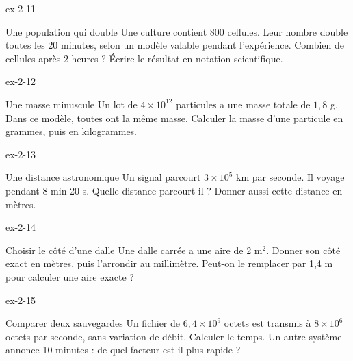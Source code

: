 \clearpage{}
\begin{blocLivre}{ex-2-11}\begin{exercice}[3]{Une population qui double}
Une culture contient 800 cellules. Leur nombre double toutes les 20 minutes, selon un modèle valable pendant l’expérience. Combien de cellules après 2 heures ? Écrire le résultat en notation scientifique.
\end{exercice}\end{blocLivre}
\begin{blocLivre}{ex-2-12}\begin{exercice}[3]{Une masse minuscule}
Un lot de $4\times10^{12}$ particules a une masse totale de $1{,}8$ g. Dans ce modèle, toutes ont la même masse. Calculer la masse d’une particule en grammes, puis en kilogrammes.
\end{exercice}\end{blocLivre}
\begin{blocLivre}{ex-2-13}\begin{exercice}[3]{Une distance astronomique}
Un signal parcourt $3\times10^5$ km par seconde. Il voyage pendant 8 min 20 s. Quelle distance parcourt-il ? Donner aussi cette distance en mètres.
\end{exercice}\end{blocLivre}
\begin{blocLivre}{ex-2-14}\begin{exercice}[3]{Choisir le côté d’une dalle}
Une dalle carrée a une aire de 2 m$^2$. Donner son côté exact en mètres, puis l’arrondir au millimètre. Peut-on le remplacer par 1,4 m pour calculer une aire exacte ?
\end{exercice}\end{blocLivre}
\begin{blocLivre}{ex-2-15}\begin{exercice}[3]{Comparer deux sauvegardes}
Un fichier de $6{,}4\times10^9$ octets est transmis à $8\times10^6$ octets par seconde, sans variation de débit. Calculer le temps. Un autre système annonce 10 minutes : de quel facteur est-il plus rapide ?
\end{exercice}\end{blocLivre}

\clearpage
